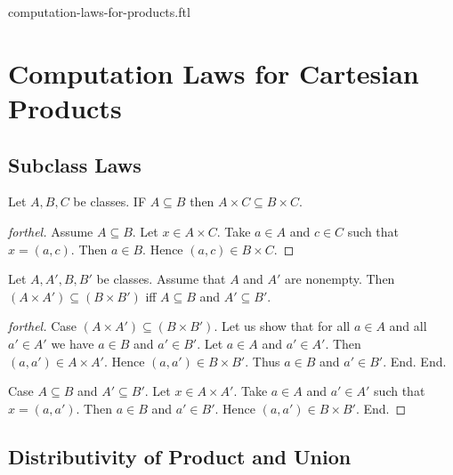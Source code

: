 \documentclass{naproche-library}
\begin{document}
\begin{smodule}{computation-laws-for-products.ftl}

  \section*{Computation Laws for Cartesian Products}

  \subsection*{Subclass Laws}

  \begin{proposition}[forthel,id=FOUNDATIONS_05_5719644021194752,printid]
    Let $A, B, C$ be classes.
    IF $A \subseteq B$ then $A \times C \subseteq B \times C$.
  \end{proposition}
  \begin{proof}[forthel]
    Assume $A \subseteq B$.
    Let $x \in A \times C$.
    Take $a \in A$ and $c \in C$ such that $x = (a, c)$.
    Then $a \in B$.
    Hence $(a, c) \in B \times C$.
  \end{proof}

  \begin{proposition}[forthel,id=FOUNDATIONS_05_4888282951319552,printid]
    Let $A, A', B, B'$ be classes.
    Assume that $A$ and $A'$ are nonempty.
    Then $(A \times A') \subseteq (B \times B')$ iff $A \subseteq B$ and $A' \subseteq B'$.
  \end{proposition}
  \begin{proof}[forthel]
    Case $(A \times A') \subseteq (B \times B')$.
      Let us show that for all $a \in A$ and all $a' \in A'$ we have $a \in B$ and $a' \in B'$.
        Let $a \in A$ and $a' \in A'$.
        Then $(a, a') \in A \times A'$.
        Hence $(a, a') \in B \times B'$.
        Thus $a \in B$ and $a' \in B'$.
      End.
    End.

    Case $A \subseteq B$ and $A' \subseteq B'$.
      Let $x \in A \times A'$.
      Take $a \in A$ and $a' \in A'$ such that $x = (a, a')$.
      Then $a \in B$ and $a' \in B'$.
      Hence $(a, a') \in B \times B'$.
    End.
  \end{proof}


  \subsection*{Distributivity of Product and Union}


\end{smodule}
\end{document}
